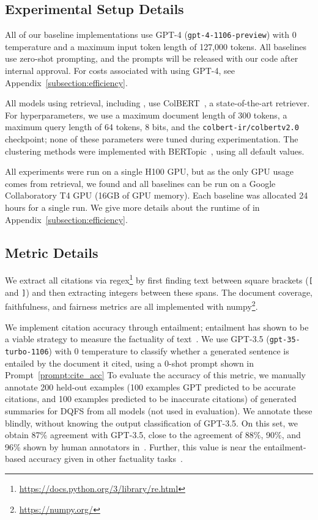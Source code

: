 \subsection{Experimental Setup Details} \label{appendix:implementation}

All of our baseline implementations use GPT-4 (\texttt{gpt-4-1106-preview}) with 0 temperature and a maximum input token length of 127,000 tokens.
All baselines use zero-shot prompting, and the prompts will be released with our code after internal approval.
For costs associated with using GPT-4, see Appendix~\ref{subsection:efficiency}.

All models using retrieval, including \model, use ColBERT~\cite{khattab2020colbert}, a state-of-the-art retriever. For hyperparameters, we use a maximum document length of 300 tokens, a maximum query length of 64 tokens, 8 bits, and the \texttt{colbert-ir/colbertv2.0} checkpoint; none of these parameters were tuned during experimentation.
The clustering methods were implemented with BERTopic~\cite{grootendorst2022bertopic}, using all default values.

All experiments were run on a single H100 GPU, but as the only GPU usage comes from retrieval, we found \model and all baselines can be run on a Google Collaboratory T4 GPU (16GB of GPU memory).
Each baseline was allocated 24 hours for a single run.
We give more details about the runtime of \model in Appendix~\ref{subsection:efficiency}.


\subsection{Metric Details} \label{appendix:metrics}

We extract all citations via regex\footnote{\url{https://docs.python.org/3/library/re.html}} by first finding text between square brackets (\texttt{[} and \texttt{]}) and then extracting integers between these spans.
The document coverage, faithfulness, and fairness metrics are all implemented with numpy\footnote{\url{https://numpy.org/}}.

We implement citation accuracy through entailment; entailment has shown to be a viable strategy to measure the factuality of text~\cite{maynez2020faithfulness}.
We use GPT-3.5 (\texttt{gpt-35-turbo-1106}) with 0 temperature to classify whether a generated sentence is entailed by the document it cited, using a 0-shot prompt shown in Prompt~\ref{prompt:cite_acc}
To evaluate the accuracy of this metric, we manually annotate 200 held-out examples (100 examples GPT predicted to be accurate citations, and 100 examples predicted to be inaccurate citations) of generated summaries for DQFS from all models (not used in evaluation).
We annotate these blindly, without knowing the output classification of GPT-3.5.
On this set, we obtain 87\% agreement with GPT-3.5, close to the agreement of 88\%, 90\%, and 96\% shown by human annotators in~\citet{min2023factscore}.
Further, this value is near the entailment-based accuracy given in other factuality tasks~\cite{balepur-etal-2023-expository, balepur-etal-2023-text}.

